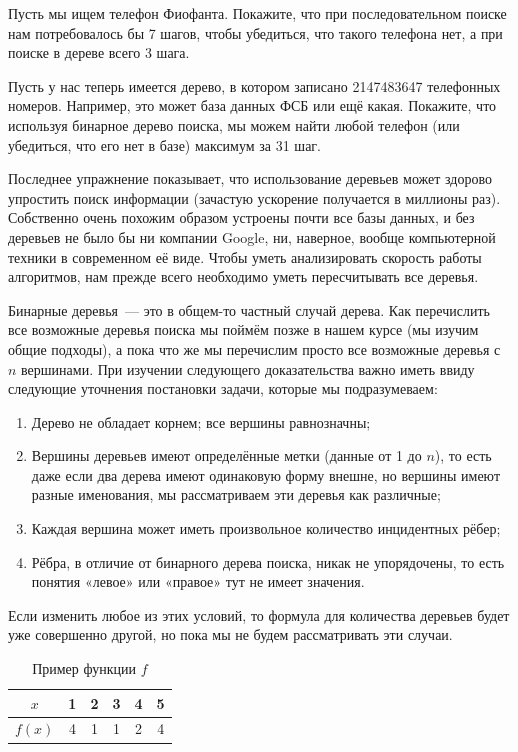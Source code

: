\begin{exercise}
Пусть мы ищем телефон Фиофанта. Покажите, что при последовательном поиске нам потребовалось бы 7 шагов, чтобы убедиться, что такого телефона нет, а при поиске  в дереве всего 3 шага.
\end{exercise}

\begin{exercise}
Пусть у нас теперь имеется дерево, в котором записано 2147483647 телефонных номеров. Например, это может база данных ФСБ или ещё какая. Покажите, что используя бинарное дерево поиска, мы можем найти любой телефон (или убедиться, что его нет в базе) максимум за 31 шаг.
\end{exercise}

Последнее упражнение показывает, что использование деревьев может здорово упростить поиск информации (зачастую ускорение получается в миллионы раз). Собственно очень похожим образом устроены почти все базы данных, и без деревьев не было бы ни компании Google, ни, наверное, вообще компьютерной техники в современном её виде. Чтобы уметь анализировать скорость работы алгоритмов, нам прежде всего необходимо уметь пересчитывать все деревья.

Бинарные деревья~— это в общем-то частный случай дерева. Как перечислить все возможные деревья поиска мы поймём позже в нашем курсе (мы изучим общие подходы), а пока что же мы перечислим  просто все возможные деревья с $n$ вершинами. При изучении следующего доказательства важно иметь ввиду следующие уточнения постановки задачи, которые мы подразумеваем:
\begin{enumerate}
\item Дерево не обладает корнем; все вершины равнозначны;
\item Вершины деревьев имеют определённые метки (данные от 1 до $n$), то есть даже если два дерева имеют одинаковую форму внешне, но вершины имеют разные именования, мы рассматриваем эти деревья как различные;
\item Каждая вершина может иметь произвольное количество инцидентных рёбер;
\item Рёбра, в отличие от бинарного дерева поиска, никак не упорядочены, то есть понятия «левое» или «правое» тут не имеет значения.
\end{enumerate}

Если изменить любое из этих условий, то формула для количества деревьев будет уже совершенно другой, но пока мы не будем рассматривать эти случаи.

\begin{table}[h]
\centering
\begin{tabular}{c|ccccc}
$x$ & 1 & 2 & 3 & 4 & 5 \\
\hline
$f(x)$ & 4 & 1 & 1 & 2 & 4
\end{tabular}
\caption{Пример функции $f$}
\end{table}

